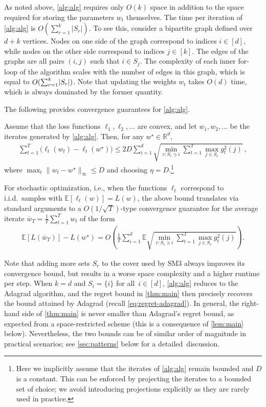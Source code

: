 \documentclass[a4paper,11pt]{article}
\newcommand{\lr}[1]{\mathopen{}\left(#1\right)}
\newcommand{\Lr}[1]{\mathopen{}\big(#1\big)}
\newcommand{\norm}[1]{\|#1\|}
\newcommand{\set}[1]{\{#1\}}
\newcommand{\abs}[1]{|#1|}
\renewcommand{\O}{O}
\newcommand{\E}{\mathbb{E}}
\newcommand{\st}{\star}
\newcommand{\reals}{\mathbb{R}}
\def\NAME{SM3\xspace}
\begin{document}
As noted above, \cref{alg:alg} requires only $O(k)$ space in addition to the
space required for storing the parameters $w_t$ themselves. The time per
iteration of \cref{alg:alg} is $O(\sum_{r=1}^k \abs{S_r})$. To see this,
consider a bipartite graph defined over $d+k$ vertices. Nodes on one side of the
graph correspond to indices $i \in [d]$, while nodes on the other side
correspond to indices $j\in[k]$. The edges of the graphs are all pairs $(i,j)$
such that $i \in S_j$.  The complexity of each inner for-loop of the
algorithm scales with the number of edges in this graph, which is equal to
$O(\smash{\sum_{r=1}^k} \abs{S_r})$. Note that updating the weights $w_t$ takes
$O(d)$ time, which is always dominated by the former quantity.



The following provides convergence guarantees for \cref{alg:alg}.
\begin{proposition} \label{thm:main}
Assume that the loss functions $\ell_1,\ell_2,\ldots$ are convex, and let
$w_1,w_2,\ldots$ be the iterates generated by \cref{alg:alg}. Then, for any
$w^\st \in \reals^d$,
\begin{align*}
  \sum_{t=1}^T \Lr{ \ell_t(w_t) - \ell_t(w^\star) }
  \leq
  2 D \sum_{i=1}^d \sqrt{\min_{r : S_r \ni i} \sum_{t=1}^T \max_{j \in S_r} g_t^2(j)}
  ~,
\end{align*}
where $\max_{t} \norm{w_t-w^\st}_\infty \leq D$ and choosing $\eta
= D$.\footnote{Here we implicitly assume that the iterates of \cref{alg:alg} remain
bounded and $D$ is a constant. This can be enforced by projecting the iterates
to a bounded set of choice; we avoid introducing projections explicitly as they
are rarely used in practice.}
\end{proposition}

For stochastic optimization, i.e., when the functions $\ell_t$ correspond to
i.i.d.~samples with $\E[\ell_t(w)] = L(w)$, the above bound translates via
standard arguments to a $O(1/\sqrt{T})$-type convergence guarantee for the
average iterate $\overline{w}_T = \frac{1}{T} \sum_{t=1}^T w_t$ of the form
\begin{align*}
  \E[L(\overline{w}_T)] - L(w^\star)
  =
  \O\lr{
  \frac{1}{T} \sum_{i=1}^d \E \sqrt{\min_{r : S_r \ni i} \sum_{t=1}^T \max_{j \in S_r} g_t^2(j)} }
  \!.
\end{align*}

Note that adding more sets $S_r$ to the cover used by \NAME always improves
its convergence bound, but results in a worse space complexity and a higher
runtime per step.
When $k=d$ and $S_i = \set{i}$ for all~$i \in [d]$, \cref{alg:alg} reduces to
the Adagrad algorithm, and the regret bound in \cref{thm:main} then precisely
recovers the bound attained by Adagrad (recall \cref{eq:regret-adagrad}).
In general, the right-hand side of \cref{thm:main} is never smaller than
Adagrad's regret bound, as expected from a space-restricted scheme (this is a
consequence of \cref{lem:main} below).
Nevertheless, the two bounds can be of similar order of magnitude in practical
scenarios; see \cref{sec:patterns} below for a detailed~discussion.
\end{document}

